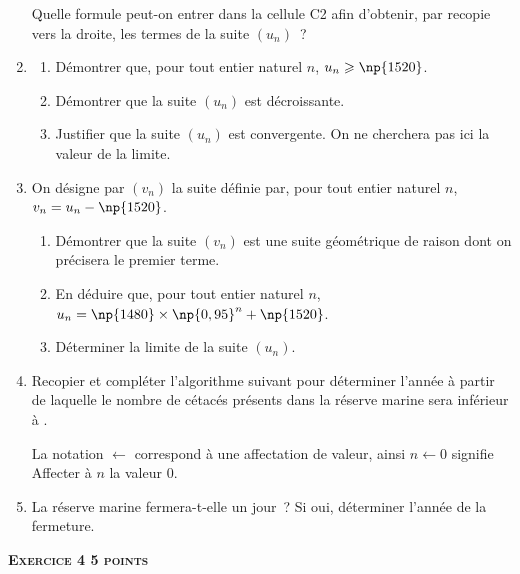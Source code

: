 \documentclass[10pt,a4paper]{article}
\begin{document}
\begin{enumerate}
Quelle formule peut-on entrer dans la cellule C2 afin d'obtenir, par recopie vers la droite, les termes de la suite $\left(u_n\right)$~?
\item 
	\begin{enumerate}
		\item Démontrer que, pour tout entier naturel $n$, $u_n \geqslant \np{1520}$.
		\item Démontrer que la suite $\left(u_n\right)$ est décroissante.
		\item Justifier que la suite $\left(u_n\right)$ est convergente. On ne cherchera pas ici la valeur de la limite.
	\end{enumerate}
\item On désigne par $\left(v_n\right)$ la suite définie par, pour tout entier naturel $n$,\: $v_n=u_n-\np{1520}$.
\begin{enumerate}
\item Démontrer que la suite $\left(v_n\right)$ est une suite géométrique de raison  dont on précisera le premier terme.
\item En déduire que, pour tout entier naturel $n$, $u_n = \np{1480}\times\np{0,95}^n + \np{1520}$.
\item Déterminer la limite de la suite $\left(u_n\right)$.
\end{enumerate}
\item Recopier et compléter l'algorithme suivant pour déterminer l'année à partir de laquelle le nombre de cétacés présents dans la réserve marine sera inférieur à .
\begin{center}
\end{center}
La notation \og $\leftarrow$\fg{} correspond à une affectation de valeur, ainsi \og $n\leftarrow 0$\fg{} signifie \og Affecter à $n$ la valeur $0$\fg.
\item La réserve marine fermera-t-elle un jour~? Si oui, déterminer l'année de la fermeture.
\end{enumerate}

\vspace{0,5cm}\textbf{\textsc{Exercice 4 \hfill 5 points}}
\end{document}
